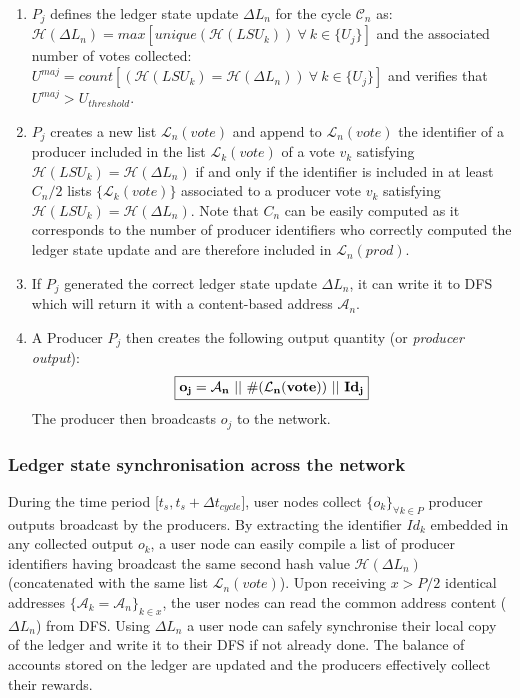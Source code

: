 \documentclass{article}
\begin{document}
\begin{enumerate}
\item $P_j$ defines the ledger state update $\Delta L_n$ for the cycle $\mathcal{C}_n$ as:\\
 $\mathcal{H}(\Delta L_n) = max[unique(\mathcal{H}(LSU_k))~\forall~k\in\{U_j\}]$ and the associated number of votes collected: $U^{maj} = count[(\mathcal{H}(LSU_k) = \mathcal{H}(\Delta L_n))~\forall~k\in\{U_j\}]$ and verifies that $U^{maj}> U_{threshold}$.
\item $P_j$ creates a new list $\mathcal{L}_{n}(vote)$ and append to $\mathcal{L}_{n}(vote)$ the identifier of a producer included in the list $\mathcal{L}_{k}(vote)$ of a vote $v_k$ satisfying $\mathcal{H}(LSU_k) = \mathcal{H}(\Delta L_n)$ if and only if the identifier is included in at least $C_n/2$ lists $\{\mathcal{L}_{k}(vote)\}$ associated to a producer vote $v_{k}$ satisfying $\mathcal{H}(LSU_k) = \mathcal{H}(\Delta L_n)$. Note that $C_n$ can be easily computed as it corresponds to the number of producer identifiers who correctly computed the ledger state update and are therefore included in $\mathcal{L}_{n}(prod)$.

\item If $P_j$ generated the correct ledger state update $\Delta L_n$, it can write it to DFS which will return it with a content-based address $\mathcal{A}_n$. 
\item A Producer $P_j$ then creates the following output quantity (or \textit{producer output}):
\begin{equation} 
\fbox{$\mathbf{o_{j} = \mathcal{A}_n~||~\#(\mathcal{L}_{n}(vote))~||~Id_j}$}
\label{eq:Hj}
\end{equation}
The producer then broadcasts $o_j$ to the network.
\end{enumerate}


\subsubsection{Ledger state synchronisation across the network}

During the time period [$t_{s}, t_s + \Delta t_{cycle}$], user nodes collect $\{o_k\}_{\forall k \in P}$ producer outputs broadcast by the producers. 
By extracting the identifier $Id_k$ embedded in any collected output $o_k$, a user node can easily compile a list of producer identifiers having broadcast the same second hash value $\mathcal{H}(\Delta L_n)$ (concatenated with the same list $\mathcal{L}_{n}(vote)$). Upon receiving $x > P/2$ identical addresses $\{\mathcal{A}_k = \mathcal{A}_n\}_{k \in x}$, the user nodes can read the common address content ($\Delta L_n$) from DFS. Using $\Delta L_n$ a user node can safely synchronise their local copy of the ledger and write it to their DFS if not already done. The balance of accounts stored on the ledger are updated and the producers effectively collect their rewards.\\
\end{document}
